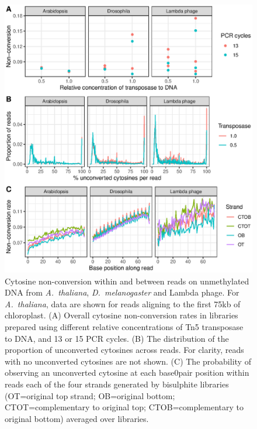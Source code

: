 \documentclass[twocolumn,twoside,lettersize]{article}
\begin{document}
\begin{figure}
  \begin{center}
    \includegraphics{figure1.eps}
    \caption{
        Cytosine non-conversion within and between reads on unmethylated DNA from \textit{A.~thaliana}, \textit{D.~melanogaster} and Lambda phage. For \textit{A.~thaliana}, data are shown for reads aligning to the first 75kb of chloroplast.
        (A) Overall cytosine non-conversion rates in libraries prepared using different relative concentrations of Tn5 transposase to DNA, and 13 or 15 PCR cycles.
        (B) The distribution of the proportion of unconverted cytosines across reads. For clarity, reads with no unconverted cytosines are not shown.
        (C) The probability of observing an unconverted cytosine at each base0pair position within reads each of the four strands generated by bisulphite libraries (OT=original top strand; OB=original bottom; CTOT=complementary to original top; CTOB=complementary to original bottom) averaged over libraries.
    }
    \label{fig:reads}
  \end{center}
\end{figure}
\end{document}
